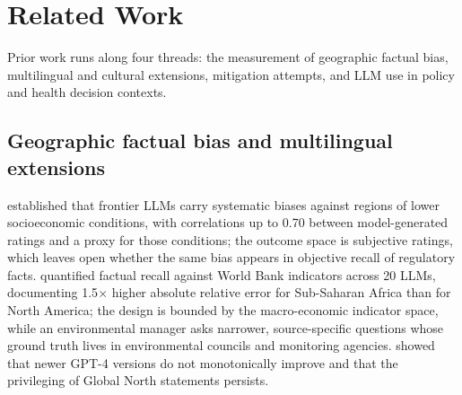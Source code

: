 \section{Related Work}
\label{sec:related}

Prior work runs along four threads: the measurement of geographic factual bias,
multilingual and cultural extensions, mitigation attempts, and LLM use in policy
and health decision contexts.

\subsection{Geographic factual bias and multilingual extensions}

\citet{manvi2024llm} established that frontier LLMs carry systematic biases
against regions of lower socioeconomic conditions, with correlations up to 0.70
between model-generated ratings and a proxy for those conditions; the outcome
space is subjective ratings, which leaves open whether the same bias appears in
objective recall of regulatory facts. \citet{moayeri2024worldbench} quantified
factual recall against World Bank indicators across 20 LLMs, documenting
1.5$\times$ higher absolute relative error for Sub-Saharan Africa than for North
America; the design is bounded by the macro-economic indicator space, while an
environmental manager asks narrower, source-specific questions whose ground
truth lives in environmental councils and monitoring agencies. \citet{mirza2024global}
showed that newer GPT-4 versions do not monotonically improve and that the
privileging of Global North statements persists.

